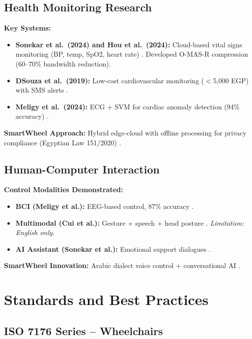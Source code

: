 \documentclass[12pt,a4paper]{report}
\begin{document}
\subsection{Health Monitoring Research}

\textbf{Key Systems:}
\begin{itemize}
    \item \textbf{Sonekar et al.\ (2024) and Hou et al.\ (2024):} Cloud-based vital signs monitoring (BP, temp, SpO2, heart rate) \cite{sonekar_2024,hou_2024}. Developed O-MAS-R compression (60--70\% bandwidth reduction).
    \item \textbf{DSouza et al.\ (2019):} Low-cost cardiovascular monitoring ($<$5,000 EGP) with SMS alerts \cite{dsouza_2019}.
    \item \textbf{Meligy et al.\ (2024):} ECG + SVM for cardiac anomaly detection (94\% accuracy) \cite{meligy_2024}.
\end{itemize}

\textbf{SmartWheel Approach:} Hybrid edge-cloud with offline processing for privacy compliance (Egyptian Law 151/2020) \cite{egypt_law_151}.

\subsection{Human-Computer Interaction}

\textbf{Control Modalities Demonstrated:}
\begin{itemize}
    \item \textbf{BCI (Meligy et al.):} EEG-based control, 87\% accuracy \cite{meligy_bci}.
    \item \textbf{Multimodal (Cui et al.):} Gesture + speech + head posture \cite{cui_multimodal}. \textit{Limitation: English only.}
    \item \textbf{AI Assistant (Sonekar et al.):} Emotional support dialogues \cite{sonekar_2024}.
\end{itemize}

\textbf{SmartWheel Innovation:}  Arabic dialect voice control + conversational AI .

\section{Standards and Best Practices}

\subsection{ISO 7176 Series -- Wheelchairs}
\end{document}
